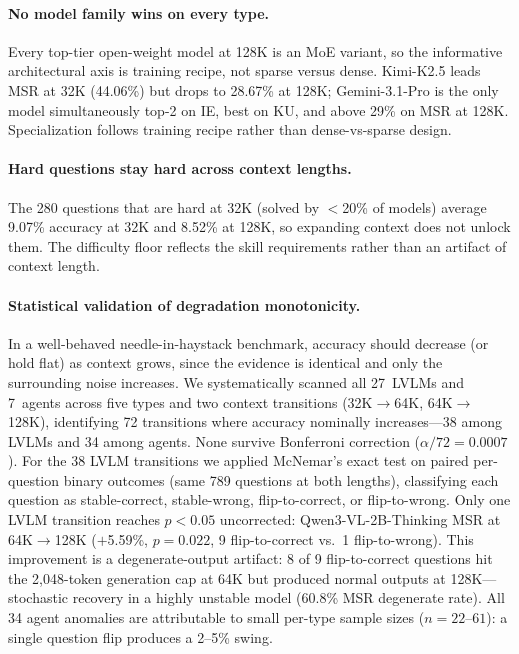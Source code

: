\documentclass{llmxive}
\begin{document}
\paragraph{No model family wins on every type.}
Every top-tier open-weight model at 128K is an MoE variant, so the informative architectural axis is training recipe, not sparse versus dense. Kimi-K2.5 leads MSR at 32K (44.06\%) but drops to 28.67\% at 128K; Gemini-3.1-Pro is the only model simultaneously top-2 on IE, best on KU, and above 29\% on MSR at 128K. Specialization follows training recipe rather than dense-vs-sparse design.

\paragraph{Hard questions stay hard across context lengths.}
The 280 questions that are hard at 32K (solved by $<$20\% of models) average 9.07\% accuracy at 32K and 8.52\% at 128K, so expanding context does not unlock them. The difficulty floor reflects the skill requirements rather than an artifact of context length.

\paragraph{Statistical validation of degradation monotonicity.}
In a well-behaved needle-in-haystack benchmark, accuracy should decrease (or hold flat) as context grows, since the evidence is identical and only the surrounding noise increases.
We systematically scanned all 27~LVLMs and 7~agents across five types and two context transitions (32K$\to$64K, 64K$\to$128K), identifying 72 transitions where accuracy nominally increases---38 among LVLMs and 34 among agents.
None survive Bonferroni correction ($\alpha/72 = 0.0007$).
For the 38 LVLM transitions we applied McNemar's exact test on paired per-question binary outcomes (same 789 questions at both lengths), classifying each question as stable-correct, stable-wrong, flip-to-correct, or flip-to-wrong.
Only one LVLM transition reaches $p < 0.05$ uncorrected: Qwen3-VL-2B-Thinking MSR at 64K$\to$128K ($+$5.59\%, $p=0.022$, 9 flip-to-correct vs.\ 1 flip-to-wrong).
This improvement is a degenerate-output artifact: 8 of 9 flip-to-correct questions hit the 2{,}048-token generation cap at 64K but produced normal outputs at 128K---stochastic recovery in a highly unstable model (60.8\% MSR degenerate rate).
All 34 agent anomalies are attributable to small per-type sample sizes ($n = 22$--$61$): a single question flip produces a 2--5\% swing.
\end{document}
